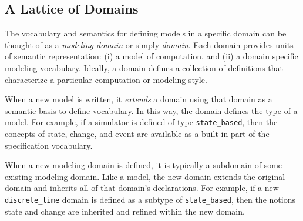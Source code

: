 \documentclass[12pt]{article}
\newcommand{\nael}[1]{\color{blue}{ \em #1 }\color{black}}
\renewcommand{\nael}[1]{}
\begin{document}
\nael{We need a domain to use as our case study here and to ground the
  descriptions.  The call mentions electronic warfare (EW),
  Intelligence surveillance and reconnaisance (ISR) and strike (which
  I assume is what it sounds like.)  Examples of EW and ISR from a
  quick search and skim include UaVs interacting with manned systems.
  At one scale you have sensor data streaming with fine grained
  spatio-temporal resolution, and at another you are making tactical
  decisions at possibly much larger times and scales.}

\nael{From an AFOSR call on EW/ISR: ``The ultimate goal for airborne
  ISR and AEW/C2BM is to enable decision superiority and this will
  continue to be enabled by the confluence of hardware assets and the
  operators and analysts. Budgets will underpin the makeup of future
  capabilities and dictate the economics of introducing new platforms
  versus upgrading capabilities as existing platforms approach
  critical junctures in their operational lifecycle. In the case of
  radar systems, demand will come from existing platforms being
  retrofitted and upgraded, as well as opportunities from new manned
  and unmanned platforms, driving shipments a CAGR of 5 percent
  through 2022.''}

\subsection{A Lattice of Domains}

The vocabulary and semantics for defining models in a specific domain
can be thought of as a \emph{modeling domain} or simply \emph{domain}.
Each domain provides units of semantic representation: (i) a model of
computation, and (ii) a domain specific modeling vocabulary.  Ideally,
a domain defines a collection of definitions that characterize a
particular computation or modeling style.

When a new model is written, it \emph{extends} a domain using that
domain as a semantic basis to define vocabulary.  In this way, the
domain defines the type of a model.  For example, if a simulator is
defined of type \lstinline!state_based!, then the concepts of state,
change, and event are available as a built-in part of the
specification vocabulary.

When a new modeling domain is defined, it is typically a subdomain of
some existing modeling domain.  Like a model, the new domain extends
the original domain and inherits all of that domain's declarations.
For example, if a new \lstinline!discrete_time! domain is defined as a
subtype of \lstinline!state_based!, then the notions state and change
are inherited and refined within the new domain.
\end{document}
